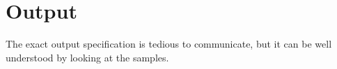 \section*{Output}

The exact output specification is tedious to communicate,
but it can be well understood by looking at the samples.

